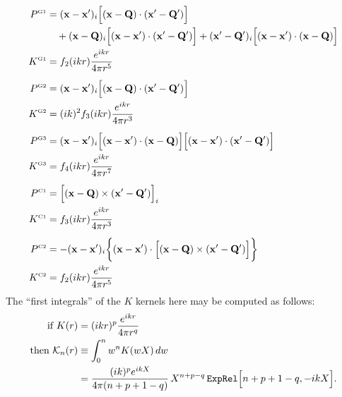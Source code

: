 \documentclass[letterpaper]{article}
\begin{document}
\begin{align*}
P^{\hbox{\tiny{G1}}} 
 &= (\mathbf{x} - \mathbf{x}^\prime)_i 
    \Big[ (\mathbf{x}-\mathbf{Q}) \cdot (\mathbf{x}^\prime-\mathbf{Q}^\prime)\Big] 
\\
 &\quad + (\mathbf{x}-\mathbf{Q})_i 
          \Big[ (\mathbf{x} - \mathbf{x}^\prime) \cdot (\mathbf{x}^\prime-\mathbf{Q}^\prime) \Big]
        + (\mathbf{x}^\prime-\mathbf{Q}^\prime)_i 
          \Big[ (\mathbf{x} - \mathbf{x}^\prime) \cdot (\mathbf{x}-\mathbf{Q}) \Big]
\\
K^{\hbox{\tiny{G1}}}
&= f_2(ikr)\frac{e^{ikr}}{4\pi r^5}
\\[5pt]
P^{\hbox{\tiny{G2}}}
&=(\mathbf{x} - \mathbf{x}^\prime)_i 
   \Big[(\mathbf{x}-\mathbf{Q}) \cdot (\mathbf{x}^\prime-\mathbf{Q}^\prime)\Big]
\\
K^{\hbox{\tiny{G2}}}
&= (ik)^2 f_3(ikr)\frac{e^{ikr}}{4\pi r^3}
\\[5pt]
P^{\hbox{\tiny{G3}}} 
&=(\mathbf{x} - \mathbf{x}^\prime)_i 
   \Big[ (\mathbf{x}-\mathbf{x}^\prime) \cdot (\mathbf{x}-\mathbf{Q})  \Big]
   \Big[ (\mathbf{x}-\mathbf{x}^\prime) \cdot (\mathbf{x}^\prime-\mathbf{Q}^\prime)  \Big]
\\
K^{\hbox{\tiny{G3}}}
&= f_4(ikr)\frac{e^{ikr}}{4\pi r^7}
\\[5pt]
P^{\hbox{\tiny{C1}}}
&=\Big[(\mathbf{x}-\mathbf{Q}) \times (\mathbf{x}^\prime - \mathbf{Q}^\prime)\Big]_i
\\
K^{\hbox{\tiny{C1}}}
&= f_3(ikr)\frac{e^{ikr}}{4\pi r^3}
\\[5pt]
P^{\hbox{\tiny{C2}}}
 &= -(\mathbf{x} - \mathbf{x}^\prime)_i
     \bigg\{ (\mathbf{x} - \mathbf{x}^\prime) \cdot 
     \Big[ (\mathbf{x}-\mathbf{Q})\times (\mathbf{x}^\prime-\mathbf{Q}^\prime) \Big]\bigg\}
\\
K^{\hbox{\tiny{C2}}}
&= 
f_2(ikr) \frac{e^{ikr}}{4\pi r^5}
\end{align*}
The ``first integrals'' of the $K$ kernels here may be computed
as follows:
\begin{align*}
 \text{if  } K(r) &= (ikr)^p \frac{e^{ikr}}{4\pi r^q} 
\\
 \text{then  } \mathcal{K}_n(r) &\equiv\int_0^n w^n K(wX) \, dw
\\
 &=\frac{(ik)^p e^{ikX}}{4\pi(n+p+1-q)}\, X^{n+p-q} \,
   \texttt{ExpRel}\Big[n+p+1-q, -ikX\Big].
\end{align*}



\newpage


\end{document}

